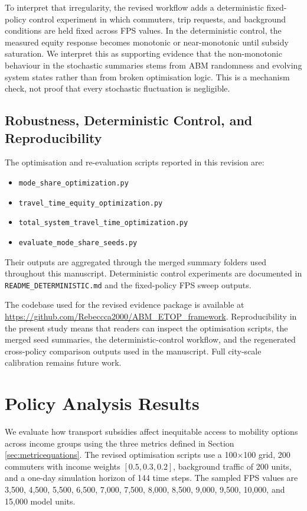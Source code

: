 \documentclass[a4paper,fleqn]{cas-sc}
\begin{document}
To interpret that irregularity, the revised workflow adds a deterministic fixed-policy control experiment in which commuters, trip requests, and background conditions are held fixed across FPS values. In the deterministic control, the measured equity response becomes monotonic or near-monotonic until subsidy saturation. We interpret this as supporting evidence that the non-monotonic behaviour in the stochastic summaries stems from ABM randomness and evolving system states rather than from broken optimisation logic. This is a mechanism check, not proof that every stochastic fluctuation is negligible.

\subsection{Robustness, Deterministic Control, and Reproducibility}
The optimisation and re-evaluation scripts reported in this revision are:
\begin{itemize}[leftmargin=*, nosep]
    \item \texttt{mode\_share\_optimization.py}
    \item \texttt{travel\_time\_equity\_optimization.py}
    \item \texttt{total\_system\_travel\_time\_optimization.py}
    \item \texttt{evaluate\_mode\_share\_seeds.py}
\end{itemize}

Their outputs are aggregated through the merged summary folders used throughout this manuscript. Deterministic control experiments are documented in \texttt{README\_DETERMINISTIC.md} and the fixed-policy FPS sweep outputs.

The codebase used for the revised evidence package is available at \url{https://github.com/Rebeccca2000/ABM_ETOP_framework}. Reproducibility in the present study means that readers can inspect the optimisation scripts, the merged seed summaries, the deterministic-control workflow, and the regenerated cross-policy comparison outputs used in the manuscript. Full city-scale calibration remains future work.

\section{Policy Analysis Results}\label{sec:results}
We evaluate how transport subsidies affect inequitable access to mobility options across income groups using the three metrics defined in Section \ref{sec:metricequations}. The revised optimisation scripts use a 100$\times$100 grid, 200 commuters with income weights $[0.5, 0.3, 0.2]$, background traffic of 200 units, and a one-day simulation horizon of 144 time steps. The sampled FPS values are 3,500, 4,500, 5,500, 6,500, 7,000, 7,500, 8,000, 8,500, 9,000, 9,500, 10,000, and 15,000 model units.
\end{document}
